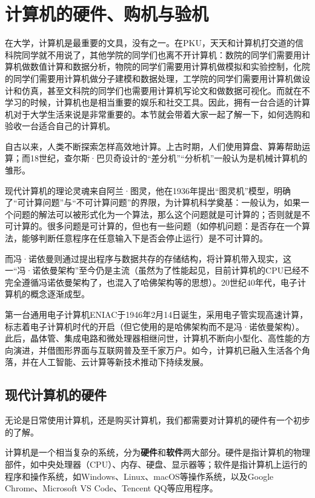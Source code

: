 \chapter{计算机的硬件、购机与验机}\label{chap:buy-and-check}

在大学，计算机是最重要的文具，没有之一。在PKU，天天和计算机打交道的信科院同学就不用说了，其他学院的同学们也离不开计算机：数院的同学们需要用计算机做数值计算和数据分析，物院的同学们需要用计算机做模拟和实验控制，化院的同学们需要用计算机做分子建模和数据处理，工学院的同学们需要用计算机做设计和仿真，甚至文科院的同学们也需要用计算机写论文和做数据可视化。而就在不学习的时候，计算机也是相当重要的娱乐和社交工具。因此，拥有一台合适的计算机对于大学生活来说是非常重要的。本节就会带着大家一起了解一下，如何选购和验收一台适合自己的计算机。

\begin{reading}[计算机发展简史]
自古以来，人类不断探索怎样高效地计算。上古时期，人们使用算盘、算筹帮助运算；而18世纪，查尔斯·巴贝奇设计的“差分机”“分析机”一般认为是机械计算机的雏形。

现代计算机的理论灵魂来自阿兰·图灵，他在1936年提出“图灵机”模型，明确了“可计算问题”与“不可计算问题”的界限，为计算机科学奠基：一般认为，如果一个问题的解法可以被形式化为一个算法，那么这个问题就是可计算的；否则就是不可计算的。很多问题是可计算的，但也有一些问题（如停机问题：是否存在一个算法，能够判断任意程序在任意输入下是否会停止运行）是不可计算的。

而冯·诺依曼则通过提出程序与数据共存的存储结构，将计算机带入现实，这一“冯·诺依曼架构”至今仍是主流（虽然为了性能起见，目前计算机的CPU已经不完全遵循冯诺依曼架构了，也混入了哈佛架构等的思想）。20世纪40年代，电子计算机的概念逐渐成型。

第一台通用电子计算机ENIAC于1946年2月14日诞生，采用电子管实现高速计算，标志着电子计算机时代的开启（但它使用的是哈佛架构而不是冯·诺依曼架构）。此后，晶体管、集成电路和微处理器相继问世，计算机不断向小型化、高性能的方向演进，并借图形界面与互联网普及至千家万户。如今，计算机已融入生活各个角落，并在人工智能、云计算等新技术推动下持续发展。
\end{reading}

\section{现代计算机的硬件}

无论是日常使用计算机，还是购买计算机，我们都需要对计算机的硬件有一个初步的了解。

计算机是一个相当复杂的系统，分为\textbf{硬件}和\textbf{软件}两大部分。硬件是指计算机的物理部件，如中央处理器（CPU）、内存、硬盘、显示器等；软件是指计算机上运行的程序和操作系统，如Windows、Linux、macOS等操作系统，以及Google Chrome、Microsoft VS Code、Tencent QQ等应用程序。

